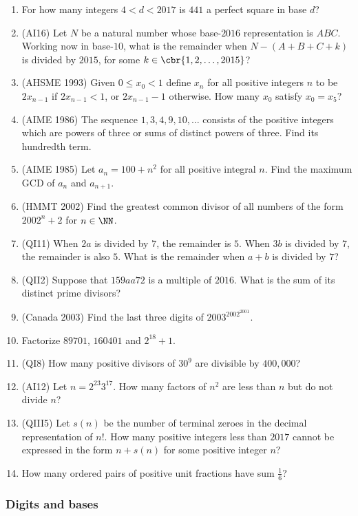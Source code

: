 \documentclass[10pt,paper=letter]{scrartcl}
\begin{document}
\begin{enumerate}
  \item For how many integers $4 < d < 2017$ is $441$ a perfect square in base $d$?
  \item (AI16) Let $N$ be a natural number whose base-$2016$ representation is $ABC$. Working now in base-$10$, what is the remainder when $N - (A + B + C + k)$ is divided by $2015$, for some $k \in \cbr{1, 2, \ldots, 2015}$?
  \item (AHSME 1993) Given $0 \leq x_0 < 1$ define $x_n$ for all positive integers $n$ to be $2x_{n-1}$ if $2x_{n-1} < 1$, or $2x_{n-1}-1$ otherwise. How many $x_0$ satisfy $x_0 = x_5$?
  \item (AIME 1986) The sequence $1, 3, 4, 9, 10, \ldots$ consists of the positive integers which are powers of three or sums of distinct powers of three. Find its hundredth term.
  \item (AIME 1985) Let $a_n = 100+n^2$ for all positive integral $n$. Find the maximum GCD of $a_n$ and $a_{n+1}$.
  \item (HMMT 2002) Find the greatest common divisor of all numbers of the form $2002^n + 2$ for $n \in \NN$.
  \item (QI11) When $2a$ is divided by $7$, the remainder is $5$. When $3b$ is divided by $7$, the remainder is also $5$. What is the remainder when $a+b$ is divided by $7$?
  \item (QII2) Suppose that $159aa72$ is a multiple of $2016$. What is the sum of its distinct prime divisors?
  \item (Canada 2003) Find the last three digits of $2003^{2002^{2001}}$.
  \item Factorize $89701$, $160401$ and $2^{18} + 1$.
  \item (QI8) How many positive divisors of $30^9$ are divisible by $400{,}000$?
  \item (AI12) Let $n = 2^{23}3^{17}$. How many factors of $n^2$ are less than $n$ but do not divide $n$?
  \item (QIII5) Let $s(n)$ be the number of terminal zeroes in the decimal representation of $n!$. How many positive integers less than $2017$ cannot be expressed in the form $n+s(n)$ for some positive integer $n$?
  \item How many ordered pairs of positive unit fractions have sum $\frac16$?
\end{enumerate}

\subsubsection*{Digits and bases}
\end{document}
